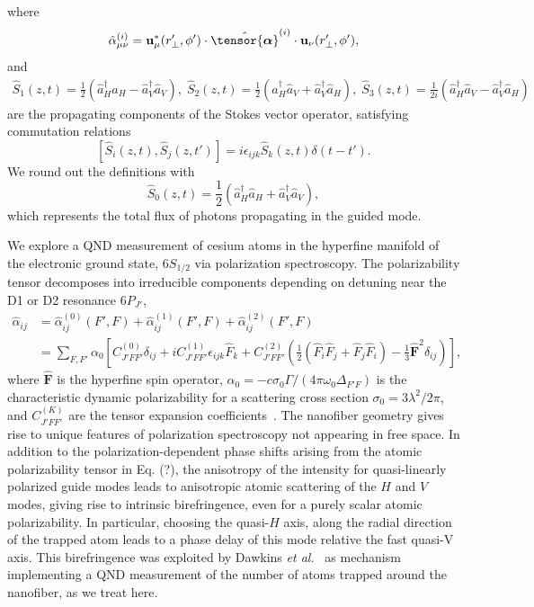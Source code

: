 \documentclass[preprint,aps,pra,onecolumn]{revtex4-1} %
\begin{document}
where
\begin{equation}  
\hat{\alpha}^{(i)}_{\mu \nu}= \mathbf{u}^*_\mu(r'_\perp,\phi')  \cdot \hat{\tensor{\boldsymbol{\alpha}}}^{(i)} \cdot \mathbf{u}_\nu(r'_\perp,\phi'),
\end{equation}
and 
\begin{align}
\hat{S}_1(z,t) = \frac{1}{2}\left(\hat{a}^\dag_H \hat{a}_H-\hat{a}^\dag_V \hat{a}_V \right), \; \hat{S}_2(z,t) = \frac{1}{2}\left(\hat{a}^\dag_H \hat{a}_V+\hat{a}^\dag_V \hat{a}_H \right), \; \hat{S}_3(z,t) = \frac{1}{2i}\left(\hat{a}^\dag_H \hat{a}_V-\hat{a}^\dag_V \hat{a}_H \right) 
\end{align}
are the propagating components of the Stokes vector operator, satisfying commutation relations
\begin{equation}
\left[\hat{S}_i(z,t), \hat{S}_j(z,t')\right] =i \epsilon_{ijk} \hat{S}_k(z,t) \delta(t-t').
\end{equation}
We round out the definitions with 
\begin{equation}
\hat{S}_0(z,t) = \frac{1}{2}\left(\hat{a}^\dag_H \hat{a}_H+\hat{a}^\dag_V \hat{a}_V \right), 
\end{equation}
which represents the total flux of photons propagating in the guided mode.

 
We explore a QND measurement of cesium atoms in the hyperfine manifold of the electronic ground state, $6S_{1/2}$ via polarization spectroscopy.  The polarizability tensor decomposes into irreducible components depending on detuning near the D1 or D2 resonance $6P_{J'}$,
\begin{align}
\hat{\alpha}_{ij} &= \hat{\alpha}_{ij}^{(0)}(F',F)+\hat{\alpha}_{ij}^{(1)}(F',F)+\hat{\alpha}_{ij}^{(2)}(F',F)\\
&=\sum_{F,F'} \alpha_0 \left[ C_{J'FF'}^{(0)} \delta_{ij}+ iC_{J'FF'}^{(1)}\epsilon_{ijk}\hat{F}_k+ C_{J'FF'}^{(2)}\left(\frac{1}{2} ( \hat{F}_i\hat{F}_j +\hat{F}_j\hat{F}_i )-\frac{1}{3}\hat{\mathbf{F}}^2 \delta_{ij} \right) \right],
\end{align}
where $\hat{\mathbf{F}}$ is the hyperfine spin operator, $\alpha_0 = -c \sigma_0\Gamma/(4\pi\omega_0 \Delta_{F'F})$ is the characteristic dynamic polarizability for a scattering cross section $\sigma_0 = 3 \lambda^2/2\pi$, and $C_{J'FF'}^{(K)}$ are the tensor expansion coefficients~\cite{?}.  The nanofiber geometry gives rise to unique features of polarization spectroscopy not appearing in free space.  In addition to the polarization-dependent phase shifts arising from the atomic polarizability tensor in Eq. (?), the anisotropy of the  intensity for quasi-linearly polarized guide modes  leads to anisotropic atomic scattering of the $H$ and $V$ modes, giving rise to intrinsic birefringence, even for a purely scalar atomic polarizability.  In particular, choosing the quasi-$H$ axis, along the radial direction of the trapped atom leads to a phase delay of this mode relative the fast quasi-V axis.  This birefringence was exploited by Dawkins {\em et al.}~\cite{?} as mechanism implementing a QND measurement of the number of atoms trapped around the nanofiber, as we treat here.
\end{document}

